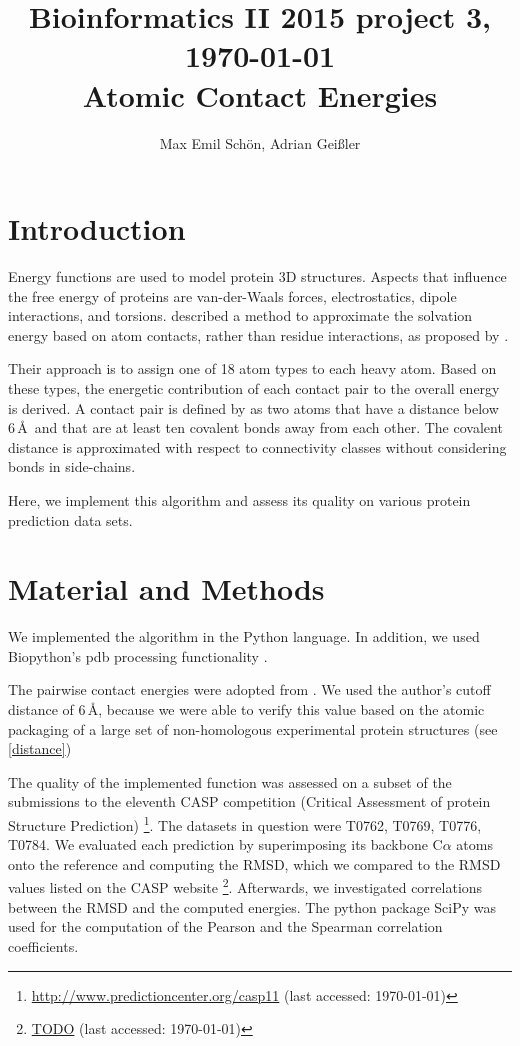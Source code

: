 \documentclass[11pt,a4paper]{article}
\newcommand{\fnurl}[2]{\footnote{\url{#1} (last accessed: #2)}} %
\begin{document}
\title{
  {\small Bioinformatics II 2015 \hfill project 3, \today}\\
   Atomic Contact Energies
}

\author{
Max Emil Schön, Adrian Geißler
}

\maketitle




\section{Introduction}
Energy functions are used to model protein 3D structures. Aspects that influence the free energy of proteins are van-der-Waals forces, electrostatics, dipole interactions, and torsions. \citet{Zhang1997} described a method to approximate the solvation energy based on atom contacts, rather than residue interactions, as proposed by \citet{Miyazawa1996}.

Their approach is to assign one of 18 atom types to each heavy atom. Based on these types, the energetic contribution of each contact pair to the overall energy is derived. A contact pair is defined by \citet{Zhang1997} as two atoms that have a distance below 6\,\AA\ and that are at least ten covalent bonds away from each other. The covalent distance is approximated with respect to connectivity classes without considering bonds in side-chains.

Here, we implement this algorithm and assess its quality on various protein prediction data sets.

\section{Material and Methods}
We implemented the algorithm in the Python language. In addition, we used Biopython's pdb processing functionality \citep{pdb}.

The pairwise contact energies were adopted from \citet{Zhang1997}. We used the
author's cutoff distance of 6\,\AA, because we were able to verify this value
based on the atomic packaging of a large set of non-homologous experimental
protein structures (see \autoref{distance})

The quality of the implemented function was assessed on a subset of the submissions to the eleventh CASP competition (Critical Assessment of protein Structure Prediction) \fnurl{http://www.predictioncenter.org/casp11}{\today}. The datasets in question were T0762, T0769, T0776, T0784. We evaluated each prediction by superimposing its backbone C$\alpha$ atoms onto the reference and computing the RMSD, which we compared to the RMSD values listed on the CASP website \fnurl{TODO}{\today}.
Afterwards, we investigated correlations between the RMSD and the computed energies. The python package SciPy \citep{scipy} was used for the computation of the Pearson and the Spearman correlation coefficients.
\end{document}
